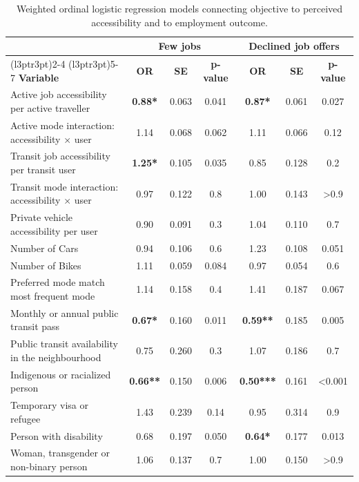 \documentclass[preprint, 3p,
authoryear]{elsarticle} %
\begin{document}
\begin{table}

\begin{threeparttable}
\caption{\label{tab:unnamed-chunk-2}\label{tab:models}Weighted ordinal logistic regression models connecting objective to perceived accessibility and to employment outcome.}
\centering
\begin{tabular}[t]{lcccccc}
\toprule
\multicolumn{1}{c}{ } & \multicolumn{3}{c}{\textbf{Few jobs}} & \multicolumn{3}{c}{\textbf{Declined job offers}} \\
\cmidrule(l{3pt}r{3pt}){2-4} \cmidrule(l{3pt}r{3pt}){5-7}
\textbf{Variable} & \textbf{OR} & \textbf{SE} & \textbf{p-value} & \textbf{OR} & \textbf{SE} & \textbf{p-value}\\
\midrule
Active job accessibility per active traveller & \textbf{0.88*} & 0.063 & 0.041 & \textbf{0.87*} & 0.061 & 0.027\\
Active mode interaction: accessibility × user & 1.14 & 0.068 & 0.062 & 1.11 & 0.066 & 0.12\\
Transit job accessibility per transit user & \textbf{1.25*} & 0.105 & 0.035 & 0.85 & 0.128 & 0.2\\
Transit mode interaction: accessibility × user & 0.97 & 0.122 & 0.8 & 1.00 & 0.143 & >0.9\\
Private vehicle accessibility per user & 0.90 & 0.091 & 0.3 & 1.04 & 0.110 & 0.7\\
\addlinespace
Number of Cars & 0.94 & 0.106 & 0.6 & 1.23 & 0.108 & 0.051\\
Number of Bikes & 1.11 & 0.059 & 0.084 & 0.97 & 0.054 & 0.6\\
Preferred mode match most frequent mode & 1.14 & 0.158 & 0.4 & 1.41 & 0.187 & 0.067\\
Monthly or annual public transit pass & \textbf{0.67*} & 0.160 & 0.011 & \textbf{0.59**} & 0.185 & 0.005\\
Public transit availability in the neighbourhood & 0.75 & 0.260 & 0.3 & 1.07 & 0.186 & 0.7\\
\addlinespace
Indigenous or racialized person & \textbf{0.66**} & 0.150 & 0.006 & \textbf{0.50***} & 0.161 & <0.001\\
Temporary visa or refugee & 1.43 & 0.239 & 0.14 & 0.95 & 0.314 & 0.9\\
Person with disability & 0.68 & 0.197 & 0.050 & \textbf{0.64*} & 0.177 & 0.013\\
Woman, transgender or non-binary person & 1.06 & 0.137 & 0.7 & 1.00 & 0.150 & >0.9\\

\end{tabular}
\end{threeparttable}
\end{table}
\end{document}
